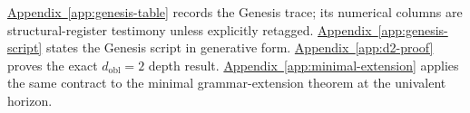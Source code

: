 \hyperref[app:genesis-table]{Appendix~\ref*{app:genesis-table}} records the
Genesis trace; its numerical columns are structural-register testimony unless
explicitly retagged. \hyperref[app:genesis-script]{Appendix~\ref*{app:genesis-script}}
states the Genesis script in generative form.
\hyperref[app:d2-proof]{Appendix~\ref*{app:d2-proof}} proves the exact
\(d_{\mathrm{obl}}=2\) depth result.
\hyperref[app:minimal-extension]{Appendix~\ref*{app:minimal-extension}}
applies the same contract to the minimal grammar-extension theorem at the
univalent horizon.
